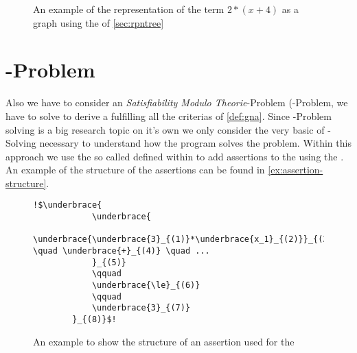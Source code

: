 \begin{figure}
	\caption{An example of the representation of the term $2*(x+4)$ as a graph using the \rpntree of \autoref{sec:rpntree}}
	\label{ex:rpntree}
\end{figure}


\section{-Problem}
\label{sec:smt-problem}
Also we have to consider an \textit{Satisfiability Modulo Theorie}-Problem (-Problem, we have to solve to derive a \gna fulfilling all the criterias of \autoref{def:gna}. Since -Problem solving is a big research topic on it's own we only consider the very basic of -Solving necessary to understand how the program solves the problem. \newline
Within this approach we use the so called  defined within \aprove to add assertions to the \solver using the \smtfactory. An example of the structure of the assertions can be found in \autoref{ex:assertion-structure}. %

\begin{figure}[H]
	\begin{lstlisting}[escapechar = !]
		!$\underbrace{
			\underbrace{
				\underbrace{\underbrace{3}_{(1)}*\underbrace{x_1}_{(2)}}_{(3)} \quad \underbrace{+}_{(4)} \quad ...
			}_{(5)} 
			\qquad
			\underbrace{\le}_{(6)}
			\qquad
			\underbrace{3}_{(7)}
		}_{(8)}$!
	\end{lstlisting}
	\caption{An example to show the structure of an assertion used for the \solver}
	\label{ex:assertion-structure}
\end{figure}

